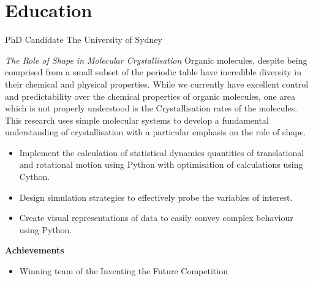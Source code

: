 



\makecvtitle{}

\vspace{-4em}
\section{Education}

{PhD Candidate}
{The University of Sydney}{}{}
{%
  \emph{The Role of Shape in Molecular Crystallisation}
  Organic molecules, despite being comprised from a small subset of the periodic table
  have incredible diversity in their chemical and physical properties.
  While we currently have excellent control and predictability over
  the chemical properties of organic molecules,
  one area which is not properly understood is
  the Crystallisation rates of the molecules.
  This research uses simple molecular systems to
  develop a fundamental understanding of crystallisation
  with a particular emphasis on the role of shape.
  \begin{itemize}
    \item Implement the calculation of statistical dynamics quantities of translational and rotational motion
      using Python with optimisation of calculations using Cython.
    \item Design simulation strategies to effectively probe the variables of interest.
    \item Create visual representations of data to easily convey complex behaviour using Python.
  \end{itemize}
  \textbf{Achievements}
  \begin{itemize}
    \item Winning team of the Inventing the Future Competition
  \end{itemize}
}
\vspace{1em}


